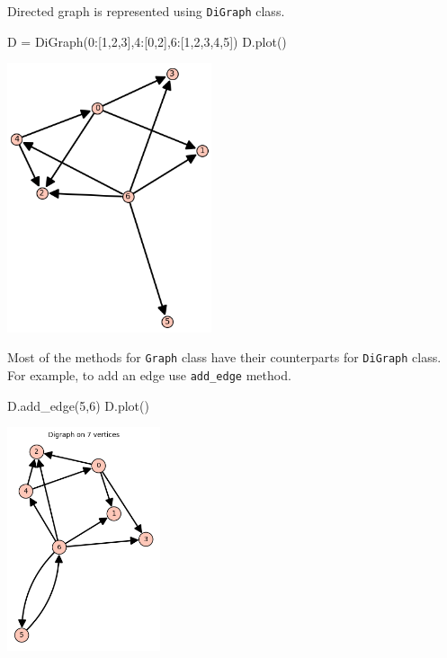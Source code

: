 Directed graph is represented using \verb|DiGraph| class.
\begin{sageCell}
    D = DiGraph({0:[1,2,3],4:[0,2],6:[1,2,3,4,5]})
    D.plot()
\end{sageCell}
\begin{outImage}
    \includegraphics[width=6cm]{Images/Introduction/output_digraph.png}
\end{outImage}
Most of the methods for \verb|Graph| class have their counterparts for \verb|DiGraph| class. For example, to add an edge use \verb|add_edge| method.
\begin{sageCell}
    D.add_edge(5,6)
    D.plot()
\end{sageCell}
\begin{outImage}
    \includegraphics[width=4.5cm]{Images/Introduction/output_digraph2.png}
\end{outImage}

